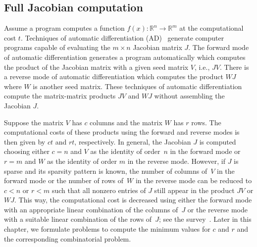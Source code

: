 \documentclass[12pt, twoside,a4paper,toc=bibliography]{scrbook}
\newcommand{\setR}{\ensuremath{\mathbb{R}}}
\newcommand{\col}{\ensuremath{c}}
\newcommand{\row}{\ensuremath{r}}
\begin{document}
\subsection{Full Jacobian computation}
\label{s.full.jac}
Assume a program computes a function $f(x) : \setR^n \rightarrow \setR^m$
at the computational cost $t$.
Techniques of automatic differentiation (AD)~\cite{Griewank2008EDP,Rall1981ADT} generate
computer programs capable of evaluating the $m \times n$ Jacobian matrix $J$.
The forward mode of automatic differentiation generates a program automatically
which computes the product of the Jacobian matrix with a given seed matrix $V$,
i.e., $JV$. There is a reverse mode of automatic differentiation which computes the product $WJ$
where $W$ is another seed matrix.
These techniques of automatic differentiation compute the matrix-matrix products $JV$ and $WJ$
without assembling the Jacobian $J$.

Suppose the matrix $V$ has $\col$ columns and the matrix $W$ has $\row$ rows.
The computational costs of these products using the forward and reverse modes
is then given by $\col t$ and $\row t$, respectively.
In general, the Jacobian $J$ is computed choosing either $c=n$ and $V$ as the identity of
order~$n$ in the forward mode or $r = m$ and $W$ as the identity of order $m$ in the
reverse mode. However, if $J$ is sparse and its sparsity pattern is known, the number of
columns of~$V$ in the forward mode or the number of rows of~$W$ in the reverse mode can
be reduced to $\col < n$ or $\row < m$ such that all nonzero entries of $J$ still appear
in the product $JV$ or $WJ$. This way, the computational cost is decreased using either
the forward mode with an appropriate linear combination of the columns of~$J$ or the reverse
mode with a suitable linear combination of the rows of~$J$; see the
survey~\cite{Gebremedhin05whatcolor}.
Later in this chapter, we formulate problems to compute the
minimum values for $\col$ and $\row$ and the corresponding combinatorial problem.
\end{document}
